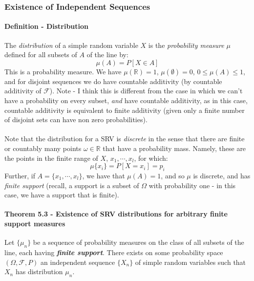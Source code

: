 \documentclass[12pt,a4paper]{article}
\newcommand{\1}[1]{\mathbbm{1}\left\{ #1 \right\}}
\newcommand{\R}{\mathbb{R}}
\newcommand{\fcal}{\mathcal{F}}
\begin{document}
\subsubsection{Existence of Independent Sequences}
\paragraph{Definition - Distribution} The \textit{distribution} of a simple random variable $X$ is the \textit{probability measure} $\mu$ defined for all subsets of $A$ of the line by:
$$
	\mu(A) = P[X \in A]
$$
This is a probability measure. We have $\mu(\R) = 1$, $\mu(\emptyset) = 0$, $0 \leq \mu(A) \leq 1$, and for disjoint sequences we do have countable additivity (by countable additivity of $\fcal$). Note - I think this is different from the case in which we can't have a probability on every subset, \textit{and} have countable additivity, as in this case, countable additivity is equivalent to finite additivity (given only a finite number of disjoint sets can have non zero probabilities).
\\\\
Note that the distribution for a SRV is \textit{discrete} in the sense that there are finite or countably many points $\omega \in \R$ that have a probability mass. Namely, these are the points in the finite range of $X$, $x_1, \cdots, x_l$, for which:
$$
	\mu\{x_i\} = P[X = x_i] = p_i
$$
Further, if $A = \{x_1, \cdots, x_l\}$, we have that $\mu(A) = 1$, and so $\mu$ is discrete, and has \textit{finite support} (recall, a support is a subset of $\Omega$ with probability one - in this case, we have a support that is finite).

\paragraph{Theorem 5.3 - Existence of SRV distributions for arbitrary finite support measures} Let $\{\mu_n\}$ be a sequence of probability measures on the class of all subsets of the line, each having \textit{\textbf{finite support}}. There exists on some probability space $(\Omega,\fcal,P)$ an independent sequence $\{X_n\}$ of simple random variables such that $X_n$ has distribution $\mu_n$.
\end{document}
